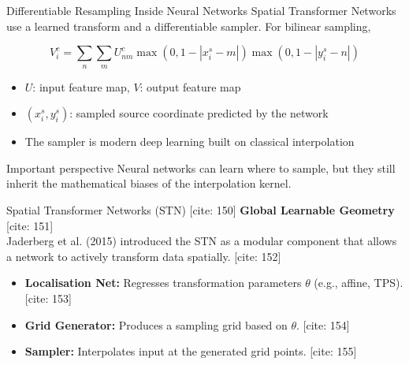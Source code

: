\documentclass[aspectratio=169,10pt]{beamer}
\begin{document}
\begin{frame}{Differentiable Resampling Inside Neural Networks}
\small
Spatial Transformer Networks use a learned transform and a differentiable sampler. For bilinear sampling,

\[
V_i^c = \sum_n \sum_m U_{nm}^c \max(0,1-|x_i^s-m|)\max(0,1-|y_i^s-n|)
\]

\begin{itemize}
\item $U$: input feature map, $V$: output feature map
\item $(x_i^s, y_i^s)$: sampled source coordinate predicted by the network
\item The sampler is modern deep learning built on classical interpolation
\end{itemize}

\begin{alertblock}{Important perspective}
Neural networks can learn where to sample, but they still inherit the mathematical biases of the interpolation kernel.
\end{alertblock}
\end{frame}

\begin{frame}{Spatial Transformer Networks (STN) [cite: 150]}
    \textbf{Global Learnable Geometry} [cite: 151]\\
    Jaderberg et al. (2015) introduced the STN as a modular component that allows a network to actively transform data spatially. [cite: 152]
    
    \vspace{0.5em}
    \begin{itemize}
        \item \textbf{Localisation Net:} Regresses transformation parameters $\theta$ (e.g., affine, TPS). [cite: 153]
        \item \textbf{Grid Generator:} Produces a sampling grid based on $\theta$. [cite: 154]
        \item \textbf{Sampler:} Interpolates input at the generated grid points. [cite: 155]
    \end{itemize}
\end{frame}
\end{document}
